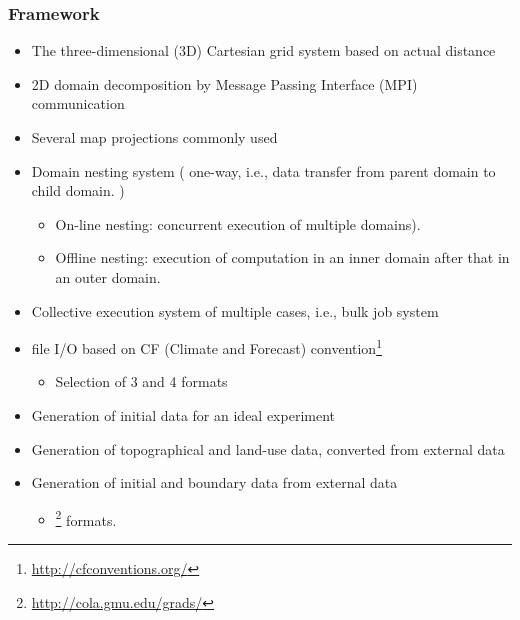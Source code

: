 \subsubsection{Framework}
\begin{itemize}
 \item The three-dimensional (3D) Cartesian grid system based on actual distance
 \item 2D domain decomposition by Message Passing Interface (MPI) communication
 \item Several map projections commonly used
 \item Domain nesting system ( one-way, i.e., data transfer from parent domain to child domain. )
   \begin{itemize}
    \item  On-line nesting: concurrent execution of multiple domains).
    \item  Offline nesting: execution of computation in an inner domain after that in an outer domain.
   \end{itemize}
 \item Collective execution system of multiple cases, i.e., bulk job system
 \item \netcdf file I/O based on CF (Climate and Forecast) convention\footnote{\url{http://cfconventions.org/}}
   \begin{itemize}
   \item Selection of {\netcdf}3 and {\netcdf}4 formats
   \end{itemize}
 \item Generation of initial data for an ideal experiment
 \item Generation of topographical and land-use data, converted from external data
 \item Generation of initial and boundary data from external data
   \begin{itemize}
    \item 
      \grads \footnote{\url{http://cola.gmu.edu/grads/}} formats.
   \end{itemize}
\end{itemize}

